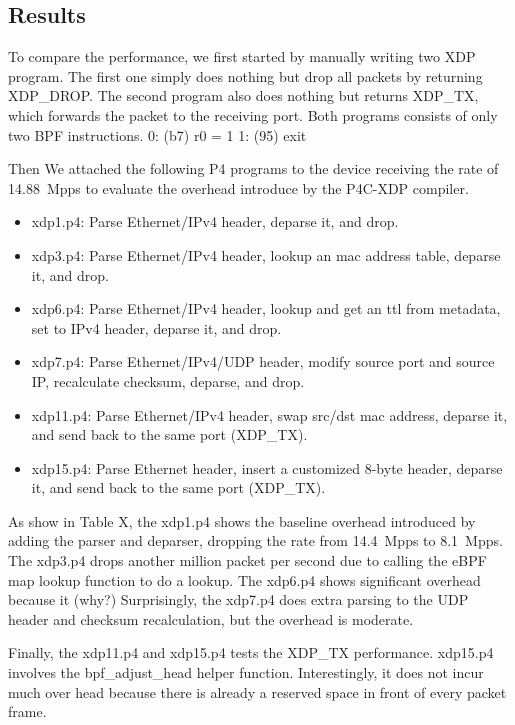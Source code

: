 \subsection{Results}
To compare the performance, we first started by manually writing two
XDP program. The first one simply does nothing but drop all packets by
returning XDP\_DROP. The second program also does nothing but returns
XDP\_TX, which forwards the packet to the receiving port.  Both programs
consists of only two BPF instructions.
0: (b7) r0 = 1
1: (95) exit

Then We attached the following P4 programs to the device receiving the
rate of 14.88~Mpps to evaluate the overhead introduce by the P4C-XDP
compiler.
\begin{itemize}
\item xdp1.p4: Parse Ethernet/IPv4 header, deparse it, and drop.
\item xdp3.p4: Parse Ethernet/IPv4 header, lookup an mac address
table, deparse it, and drop.
\item xdp6.p4: Parse Ethernet/IPv4 header, lookup and get an 
ttl from metadata, set to IPv4 header, deparse it, and drop.
\item xdp7.p4: Parse Ethernet/IPv4/UDP header, modify source port
and source IP, recalculate checksum, deparse, and drop.
\item xdp11.p4: Parse Ethernet/IPv4 header, swap src/dst mac address,
deparse it, and send back to the same port (XDP\_TX).
\item xdp15.p4: Parse Ethernet header, insert a customized 8-byte header,
deparse it, and send back to the same port (XDP\_TX).
\end{itemize}


As show in Table X, the xdp1.p4 shows the baseline overhead introduced
by adding the parser and deparser, dropping the rate from 14.4~Mpps to
8.1~Mpps. The xdp3.p4 drops another million packet per second due to
calling the eBPF map lookup function to do a lookup.
The xdp6.p4 shows significant overhead because it (why?) 
Surprisingly, the xdp7.p4 does extra parsing to the UDP header and
checksum recalculation, but the overhead is moderate.

Finally, the xdp11.p4 and xdp15.p4 tests the XDP\_TX performance.
xdp15.p4 involves the bpf\_adjust\_head helper function.
Interestingly, it does not incur much over head because there is
already a reserved space in front of every packet frame.

